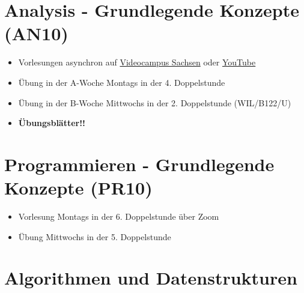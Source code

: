 \documentclass[a4paper,deutsch]{article}
\begin{document}
\section{Analysis - Grundlegende Konzepte (AN10)}
\begin{itemize}
\item Vorlesungen asynchron auf \href{https://videocampus.sachsen.de/album/view/aid/75}{Videocampus Sachsen} oder \href{https://www.youtube.com/playlist?list=PL_KzTEQSuCExpKKzITYo_CG95qr94sZqS}{YouTube}
\item Übung in der A-Woche Montags in der 4. Doppelstunde
\item Übung in der B-Woche Mittwochs in der 2. Doppelstunde (WIL/B122/U)
\item \textbf{Übungsblätter!!}
\end{itemize}

\section{Programmieren - Grundlegende Konzepte (PR10)}
\begin{itemize}
\item Vorlesung Montags in der 6. Doppelstunde über Zoom
\item Übung Mittwochs in der 5. Doppelstunde
\end{itemize}

\section{Algorithmen und Datenstrukturen}
\end{document}
